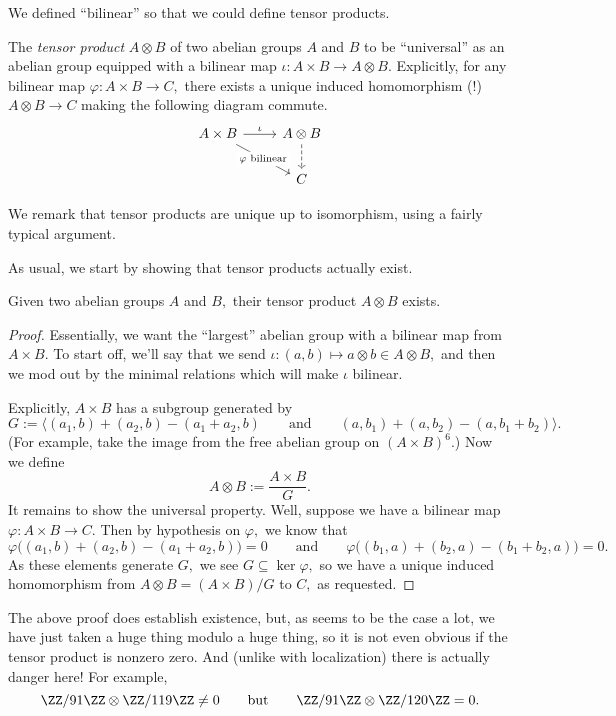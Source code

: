 \documentclass[../notes.tex]{subfiles}
\begin{document}
We defined ``bilinear'' so that we could define tensor products.
\begin{defi}
	The \textit{tensor product} $A\otimes B$ of two abelian groups $A$ and $B$ to be ``universal'' as an abelian group equipped with a bilinear map $\iota:A\times B\to A\otimes B.$ Explicitly, for any bilinear map $\varphi:A\times B\to C,$ there exists a unique induced homomorphism (!) $A\otimes B\to C$ making the following diagram commute.
	\[\begin{tikzcd}
		{A\times B} & {A\otimes B} \\
		& C
		\arrow["{\varphi\text{ bilinear}}"{description}, from=1-1, to=2-2]
		\arrow[dashed, from=1-2, to=2-2]
		\arrow["\iota", from=1-1, to=1-2]
	\end{tikzcd}\]
\end{defi}
We remark that tensor products are unique up to isomorphism, using a fairly typical argument.

As usual, we start by showing that tensor products actually exist.
\begin{proposition}
	Given two abelian groups $A$ and $B,$ their tensor product $A\otimes B$ exists.
\end{proposition}
\begin{proof}
	Essentially, we want the ``largest'' abelian group with a bilinear map from $A\times B.$ To start off, we'll say that we send $\iota:(a,b)\mapsto a\otimes b\in A\otimes B,$ and then we mod out by the minimal relations which will make $\iota$ bilinear.
	
	Explicitly, $A\times B$ has a subgroup generated by
	\[G:=\big\langle(a_1,b)+(a_2,b)-(a_1+a_2,b)\qquad\text{and}\qquad(a,b_1)+(a,b_2)-(a,b_1+b_2)\big\rangle.\]
	(For example, take the image from the free abelian group on $(A\times B)^6.$) Now we define
	\[A\otimes B:=\frac{A\times B}G.\]
	It remains to show the universal property. Well, suppose we have a bilinear map $\varphi:A\times B\to C.$ Then by hypothesis on $\varphi,$ we know that
	\[\varphi\big((a_1,b)+(a_2,b)-(a_1+a_2,b)\big)=0\qquad\text{and}\qquad\varphi\big((b_1,a)+(b_2,a)-(b_1+b_2,a)\big)=0.\]
	As these elements generate $G,$ we see $G\subseteq\ker\varphi,$ so we have a unique induced homomorphism from $A\otimes B=(A\times B)/G$ to $C,$ as requested.
\end{proof}
The above proof does establish existence, but, as seems to be the case a lot, we have just taken a huge thing modulo a huge thing, so it is not even obvious if the tensor product is nonzero zero. And (unlike with localization) there is actually danger here! For example,
\[\ZZ/91\ZZ\otimes\ZZ/119\ZZ\ne0\qquad\text{but}\qquad\ZZ/91\ZZ\otimes\ZZ/120\ZZ=0.\]
\end{document}
